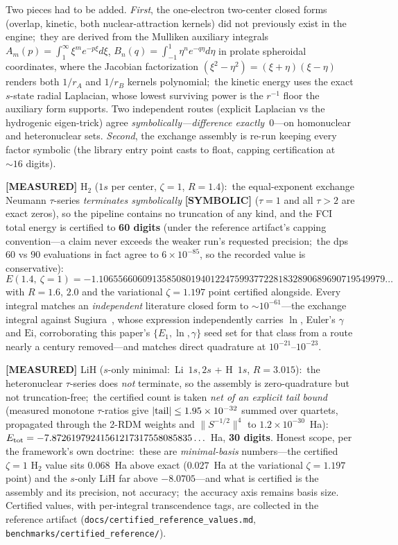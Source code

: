 \documentclass[aps,pra,twocolumn,superscriptaddress,longbibliography]{revtex4-2}
\begin{document}
Two pieces had to be added.  \emph{First}, the one-electron two-center closed
forms (overlap, kinetic, both nuclear-attraction kernels) did not previously
exist in the engine;\ they are derived from the Mulliken auxiliary integrals
$A_m(p)=\int_1^\infty \xi^m e^{-p\xi}d\xi$, $B_n(q)=\int_{-1}^{1}\eta^n
e^{-q\eta}d\eta$ in prolate spheroidal coordinates, where the Jacobian
factorization $(\xi^2-\eta^2)=(\xi+\eta)(\xi-\eta)$ renders both $1/r_A$ and
$1/r_B$ kernels polynomial;\ the kinetic energy uses the exact $s$-state radial
Laplacian, whose lowest surviving power is the $r^{-1}$ floor the auxiliary
form supports.  Two independent routes (explicit Laplacian vs the hydrogenic
eigen-trick) agree \emph{symbolically---difference exactly~$0$}---on
homonuclear and heteronuclear sets.  \emph{Second}, the exchange assembly is
re-run keeping every factor symbolic (the library entry point casts to float,
capping certification at $\sim\!16$ digits).

\textbf{[MEASURED]} H$_2$ ($1s$ per center, $\zeta=1$, $R=1.4$):\ the
equal-exponent exchange Neumann $\tau$-series \emph{terminates symbolically} \textbf{[SYMBOLIC]}
($\tau=1$ and all $\tau>2$ are exact zeros), so the pipeline contains no
truncation of any kind, and the FCI total energy is certified to \textbf{60
digits} (under the reference artifact's capping convention---a claim never exceeds the
weaker run's requested precision;\ the dps~$60$ vs $90$ evaluations in fact agree to
$6\times10^{-85}$, so the recorded value is conservative):
\[
E(1.4,\ \zeta{=}1)=-1.10655660609135850801940122475993772281832890689690719549979\ldots
\]
with $R=1.6$, $2.0$ and the variational $\zeta=1.197$ point certified
alongside.  Every integral matches an \emph{independent} literature closed
form to $\sim\!10^{-61}$---the exchange integral against
Sugiura~\cite{sugiura1927}, whose expression independently carries $\ln$,
Euler's $\gamma$ and $\mathrm{Ei}$, corroborating this paper's
$\{E_1,\ln,\gamma\}$ seed set for that class from a route nearly a century
removed---and matches direct quadrature at $10^{-21}$--$10^{-23}$.

\textbf{[MEASURED]} LiH ($s$-only minimal:\ Li~$1s,2s$ + H~$1s$, $R=3.015$):\
the heteronuclear $\tau$-series does \emph{not} terminate, so the assembly is
zero-quadrature but not truncation-free;\ the certified count is taken
\emph{net of an explicit tail bound} (measured monotone $\tau$-ratios give
$|{\rm tail}|\le 1.95\times10^{-32}$ summed over quartets, propagated through
the 2-RDM weights and $\|S^{-1/2}\|^4$ to $1.2\times10^{-30}$~Ha):\
$E_{\rm tot}=-7.87261979241561217317558085835\ldots$~Ha,
\textbf{30 digits}.  Honest scope, per the framework's own doctrine:\ these
are \emph{minimal-basis} numbers---the certified $\zeta{=}1$ H$_2$ value sits
$0.068$~Ha above exact ($0.027$~Ha at the variational $\zeta=1.197$ point) and
the $s$-only LiH far above $-8.0705$---and what is certified is the assembly
and its precision, not accuracy;\ the accuracy axis remains basis size.
Certified values, with per-integral transcendence tags, are collected in the
reference artifact (\texttt{docs/certified\_reference\_values.md},
\texttt{benchmarks/certified\_reference/}).
\end{document}
